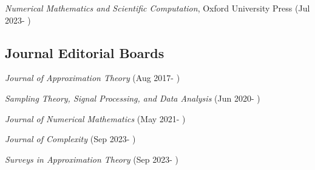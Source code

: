 \documentclass[11pt]{article}
\begin{document}
\bitemize
\item
{\em Numerical Mathematics and Scientific Computation}, Oxford University Press (Jul 2023- )
\eitemize


\subsection{Journal Editorial Boards}

\bitemize
\item
{\sl Journal of Approximation Theory} (Aug 2017- )
\item
{\sl Sampling Theory, Signal Processing, and Data Analysis} (Jun 2020- )
\item
{\sl Journal of Numerical Mathematics} (May 2021- )
\item 
{\sl Journal of Complexity} (Sep 2023- )
\item 
{\sl Surveys in Approximation Theory} (Sep 2023- )
\eitemize

%
 
\end{document}
